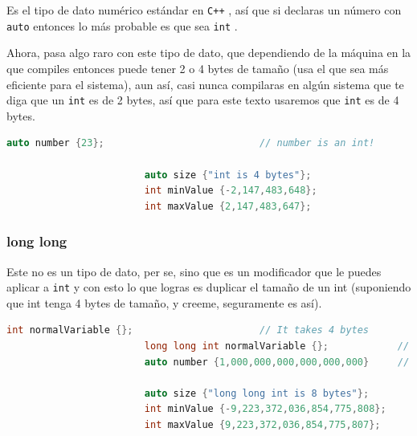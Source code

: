\documentclass[12pt, fleqn]{report}                             %
\theoremstyle{break}                                            %
\newcommand{\textCode}[1]  { \texttt{#1} }                      %
\newcommand \Cpp  {\textCode{C++} }                               %
\begin{document}
                    Es el tipo de dato numérico estándar en \Cpp, así que si declaras un número
                    con \textCode{auto} entonces lo más probable es que sea \textCode{int}.

                    Ahora, pasa algo raro con este tipo de dato, que dependiendo de la máquina
                    en la que compiles entonces puede tener 2 o 4 bytes de tamaño (usa el que
                    sea más eficiente para el sistema), aun así, casi nunca compilaras en 
                    algún sistema que te diga que un \textCode{int} es de 2 bytes, así que para
                    este texto usaremos que \textCode{int} es de 4 bytes.
                    \begin{lstlisting}[language=C++, gobble=24]
                        auto number {23};                           // number is an int!

                        auto size {"int is 4 bytes"};
                        int minValue {-2,147,483,648};
                        int maxValue {2,147,483,647};
                    \end{lstlisting}

                \subsubsection{long long}

                    Este no es un tipo de dato, per se, sino que es un modificador que le puedes aplicar
                    a \textCode{int} y con esto lo que logras es duplicar el tamaño de un int (suponiendo
                    que int tenga 4 bytes de tamaño, y creeme, seguramente es así).
                    \begin{lstlisting}[language=C++, gobble=24]
                        int normalVariable {};                      // It takes 4 bytes     
                        long long int normalVariable {};            // It takes 8 bytes 
                        auto number {1,000,000,000,000,000,000}     // number is long long  

                        auto size {"long long int is 8 bytes"};
                        int minValue {-9,223,372,036,854,775,808};
                        int maxValue {9,223,372,036,854,775,807};
                    \end{lstlisting}
\end{document}
